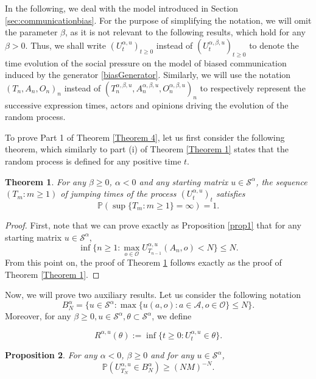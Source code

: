 \documentclass[11pt]{article}
\newtheorem{theorem}{Theorem}
\newtheorem{proposition}[theorem]{Proposition}
\theoremstyle{definition}
\newcommand{\st}{\mathcal{S}}
\newcommand{\A}{\mathcal{A}}
\newcommand{\opn}{\mathcal{O}}
\def\P{{\mathbb P}}
\begin{document}
In the following, we deal with the model introduced in Section \ref{sec:communicationbias}. For the purpose of simplifying the notation, we will omit the parameter $\beta$, as it is not relevant to the following results, which hold for any $\beta>0$. Thus, we shall write $(U_{t}^{\alpha,u})_{t\geq 0}$ instead of $(U_{t}^{\alpha, \beta, u})_{t\geq 0}$ to denote the time evolution of the social pressure on the model of biased communication induced by the generator \eqref{biasGenerator}. 
Similarly, we will use the notation $(T_n,A_n,O_n)_n$ instead of $(T_n^{\alpha,\beta,u},A_n^{\alpha,\beta,u},O_n^{\alpha,\beta,u})_n$ to respectively represent the successive expression times, actors and opinions driving the evolution of the random process. 

To prove Part 1 of Theorem \ref{Theorem 4}, let us first consider the following theorem, which similarly to part (i) of Theorem \ref{Theorem 1} states that the random process is defined for any positive time $t$.

\begin{theorem}\label{Theorem 1_alpha}
    For any $\beta\geq 0$, $\alpha<0$ and any starting matrix $u\in\mathcal{S}^{\alpha}$, the sequence $(T_m:m\geq 1)$ of jumping times of the process $(U^{\alpha, u}_t)_t$ satisfies
    \[\mathbb{P}(\sup\{T_m:m\geq 1\} = \infty)=1. \]
\end{theorem}

\begin{proof}
First, note that we can prove exactly as Proposition \ref{prop1} that for any starting matrix $u\in\st^{\alpha}$,
    $$
        \inf\{n\geq 1:\max_{o\in \mathcal{O}} U^{\alpha,u}_{T_{n-1}}(A_n,o)<N \} \leq N.
    $$
From this point on, the proof of Theorem \ref{Theorem 1_alpha} follows exactly as the proof of Theorem \ref{Theorem 1}.
\end{proof}

Now, we will prove two auxiliary results.
Let us consider the following notation
$$
B_N^{\alpha}=\{u \in \st^{\alpha}: \max\{u(a,o): a \in \A,o\in \opn\}\leq N\}.
$$
Moreover, for any $\beta\geq0, u\in\mathcal{S}^{\alpha}, \theta \subset\mathcal{S}^{\alpha}$, we define

$$
    R^{\alpha,u}(\theta):=\inf\{t\geq0:U^{\alpha,u}_t\in\theta\}.
$$

\begin{proposition} \label{prop1_teo4} For any $\alpha <0$, $\beta \geq 0$ and
for any $u \in \mathcal{S}^\alpha$,
$$
\P\left(U_{T_N}^{\alpha,u} \in B_N^{\alpha}\right)\geq  (NM)^{-N}.
$$
\end{proposition}
 
\end{document}
